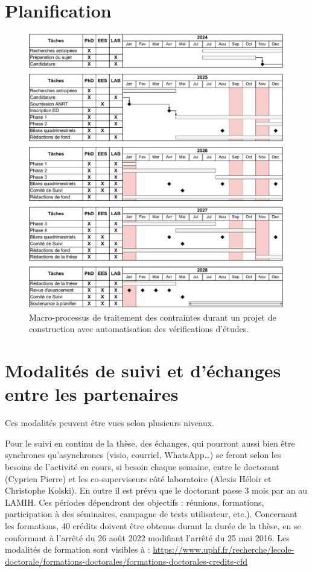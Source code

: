 \documentclass[a4paper,12pt]{article}
\begin{document}
\section{Planification}
\label{sec:orgf039912}
\begin{figure}[htbp]
\centering
\includegraphics[width=.9\linewidth]{../svg/these-gantt-init.pdf}
\caption{\label{fig:org024fcf9}Macro-processus de traitement des contraintes durant un projet de construction avec automatisation des vérifications d’études.}
\end{figure}
\section{Modalités de suivi et d'échanges entre les partenaires}
\label{sec:org92a4dd3}
Ces modalités peuvent être vues selon plusieurs niveaux.

Pour le suivi en continu de la thèse, des échanges, qui pourront aussi bien être synchrones qu'asynchrones (visio, courriel, WhatsApp\ldots{}) se feront selon les besoins de l'activité en cours, si besoin chaque semaine, entre le doctorant (Cyprien Pierre) et les co-superviseurs côté laboratoire (Alexis Héloir et Christophe Kolski). En outre il est prévu que le doctorant passe 3 mois par an au LAMIH. Ces périodes dépendront des objectifs : réunions, formations, participation à des séminaires, campagne de tests utilisateur, etc.). Concernant les formations, 40 crédits doivent être obtenus durant la durée de la thèse, en se conformant à l'arrêté du 26 août 2022 modifiant l'arrêté du 25 mai 2016. Les modalités de formation sont visibles à :
\url{https://www.uphf.fr/recherche/lecole-doctorale/formations-doctorales/formations-doctorales-credits-cfd}
\end{document}
